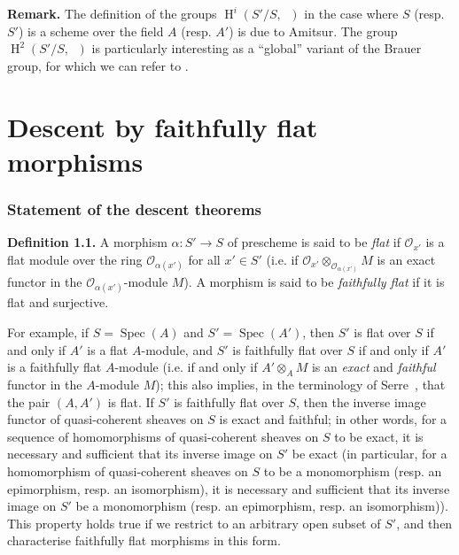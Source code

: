 \documentclass{article}
\newenvironment{rmenv}[1]
  {\phantomsection\par\medskip\noindent\textbf{#1.}\rmfamily}
  {\medskip}
\newcommand{\scr}[1]{{\mathscr{#1}}}
\DeclareMathOperator{\HH}{H}
\DeclareMathOperator{\Gm}{G_m}
\DeclareMathOperator{\Spec}{Spec}
\newcommand{\oldpage}[1]{\marginpar{\footnotesize$\Big\vert$ \textit{p.~#1}}}
\begin{document}
\begin{rmenv}{Remark}
  The definition of the groups $\HH^i(S'/S,\Gm)$ in the case where $S$ (resp. $S'$) is a scheme over the field $A$ (resp. $A'$) is due to Amitsur.
  The group $\HH^2(S'/S,\Gm)$ is particularly interesting as a ``global'' variant of the Brauer group, for which we can refer to \cite[chap.~VII]{1}.
\end{rmenv}



\part{Descent by faithfully flat morphisms}
\label{B}

\section{Statement of the descent theorems}
\label{B.1}

\begin{rmenv}{Definition 1.1}
  A morphism $\alpha\colon S'\to S$ of prescheme is said to be \emph{flat} if $\scr{O}_{x'}$ is a flat module over the ring $\scr{O}_{\alpha(x')}$ for all $x'\in S'$ (i.e. if $\scr{O}_{x'}\otimes_{\scr{O}_{\alpha(x')}}M$ is an exact functor in the $\scr{O}_{\alpha(x')}$-module $M$).
  A morphism is said to be \emph{faithfully flat} if it is flat and surjective.
\end{rmenv}

For example, if $S=\Spec(A)$ and $S'=\Spec(A')$, then $S'$ is flat over $S$ if and only if $A'$ is a flat $A$-module, and $S'$ is faithfully flat over $S$ if and only if $A'$ is a faithfully flat $A$-module (i.e. if and only if $A'\otimes_A M$ is an \emph{exact} and \emph{faithful} functor in the $A$-module $M$);
this also implies, in the terminology of Serre~\cite{5}, that the pair $(A,A')$ is flat.
If $S'$ is faithfully flat over $S$, then the inverse image functor of quasi-coherent sheaves on $S$ is exact and faithful;
in other words, for a sequence of homomorphisms of
\oldpage{190-17}
quasi-coherent sheaves on $S$ to be exact, it is necessary and sufficient that its inverse image on $S'$ be exact (in particular, for a homomorphism of quasi-coherent sheaves on $S$ to be a monomorphism (resp. an epimorphism, resp. an isomorphism), it is necessary and sufficient that its inverse image on $S'$ be a monomorphism (resp. an epimorphism, resp. an isomorphism)).
This property holds true if we restrict to an arbitrary open subset of $S'$, and then characterise faithfully flat morphisms in this form.
\end{document}
